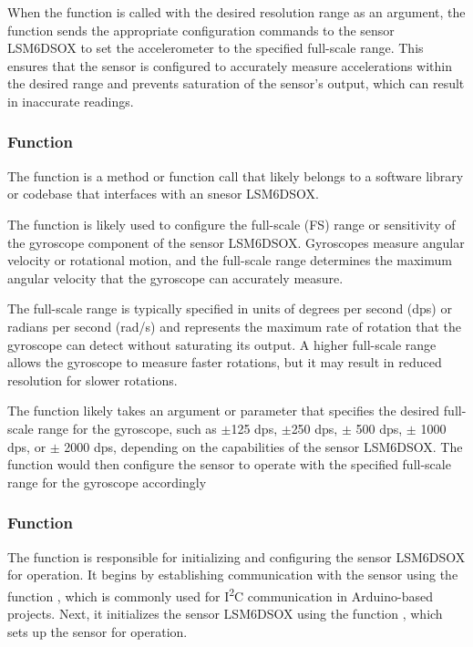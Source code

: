 When the function  is called with the desired resolution range as an argument, the function sends the appropriate configuration commands to the sensor  LSM6DSOX to set the accelerometer to the specified full-scale range. This ensures that the sensor is configured to accurately measure accelerations within the desired range and prevents saturation of the sensor's output, which can result in inaccurate readings.

\subsubsection{Function }
The function  is a method or function call that likely belongs to a software library or codebase that interfaces with an snesor LSM6DSOX. 

The function  is likely used to configure the full-scale (FS) range or sensitivity of the gyroscope component of the sensor LSM6DSOX. Gyroscopes measure angular velocity or rotational motion, and the full-scale range determines the maximum angular velocity that the gyroscope can accurately measure.

The full-scale range is typically specified in units of degrees per second (dps) or radians per second (rad/s) and represents the maximum rate of rotation that the gyroscope can detect without saturating its output. A higher full-scale range allows the gyroscope to measure faster rotations, but it may result in reduced resolution for slower rotations.

The function  likely takes an argument or parameter that specifies the desired full-scale range for the gyroscope, such as $\pm$125 dps, $\pm$250 dps, $\pm$ 500 dps, $\pm$ 1000 dps, or $\pm$ 2000 dps, depending on the capabilities of the sensor LSM6DSOX. The function would then configure the sensor to operate with the specified full-scale range for the gyroscope accordingly

\subsubsection{Function }

The function  is responsible for initializing and configuring the sensor LSM6DSOX for operation. It begins by establishing communication with the sensor using the function , which is commonly used for I\textsuperscript{2}C communication in Arduino-based projects. Next, it initializes the sensor LSM6DSOX using the function , which sets up the sensor for operation.

